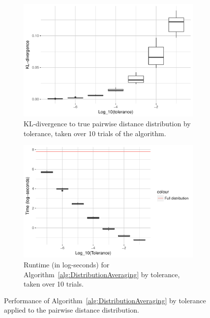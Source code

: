 \documentclass{article}
\begin{document}
\begin{figure}
\begin{subfigure}{.5\textwidth}
        \includegraphics[width=\linewidth]{Figures/PairwiseDistance/div_by_tol.pdf}
    	\caption{KL-divergence to true pairwise distance distribution by tolerance, taken over 10 trials of the algorithm.}
    	\label{fig:Divergences}
	\end{subfigure}
    \begin{subfigure}{.5\textwidth}
    	\includegraphics[width=0.9\linewidth]{Figures/PairwiseDistance/log_time_by_tol.pdf}
    	\caption{Runtime (in log-seconds) for Algorithm~\ref{alg:DistributionAveraging} by tolerance, taken over 10 trials.}
    	\label{fig:Times}
    \end{subfigure}
    \caption{Performance of Algorithm~\ref{alg:DistributionAveraging} by tolerance applied to the pairwise distance distribution.}
\end{figure}
\end{document}
